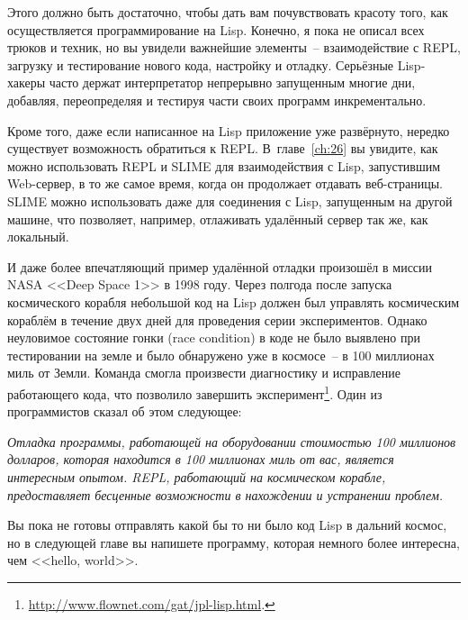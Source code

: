 Этого должно быть достаточно, чтобы дать вам почувствовать красоту того, как
осуществляется программирование на Lisp. Конечно, я пока не описал всех трюков и техник,
но вы увидели важнейшие элементы~-- взаимодействие с REPL, загрузку и тестирование нового
кода, настройку и отладку. Серьёзные Lisp-хакеры часто держат интерпретатор непрерывно
запущенным многие дни, добавляя, переопределяя и тестируя части своих программ
инкрементально.

Кроме того, даже если написанное на Lisp приложение уже развёрнуто, нередко существует
возможность обратиться к REPL. В~главе~\ref{ch:26} вы увидите, как можно использовать REPL
и SLIME для взаимодействия с Lisp, запустившим Web-сервер, в то же самое время, когда он
продолжает отдавать веб-страницы. SLIME можно использовать даже для соединения с Lisp,
запущенным на другой машине, что позволяет, например, отлаживать удалённый сервер так же,
как локальный.

И даже более впечатляющий пример удалённой отладки произошёл в миссии NASA <<Deep Space 1>>
в 1998 году. Через полгода после запуска космического корабля небольшой код на Lisp
должен был управлять космическим кораблём в течение двух дней для проведения серии
экспериментов. Однако неуловимое состояние гонки (race condition) в коде не было выявлено
при тестировании на земле и было обнаружено уже в космосе~-- в 100 миллионах миль от Земли.
Команда смогла произвести диагностику и исправление работающего кода, что позволило завершить
эксперимент\footnote{\url{http://www.flownet.com/gat/jpl-lisp.html}.}. Один из
программистов сказал об этом следующее:

\emph{Отладка программы, работающей на оборудовании стоимостью 100 миллионов долларов, которая
находится в 100 миллионах миль от вас, является интересным опытом. REPL, работающий на
космическом корабле, предоставляет бесценные возможности в нахождении и устранении
проблем.}

Вы пока не готовы отправлять какой бы то ни было код Lisp в дальний космос, но в следующей
главе вы напишете программу, которая немного более интересна, чем <<hello, world>>.


